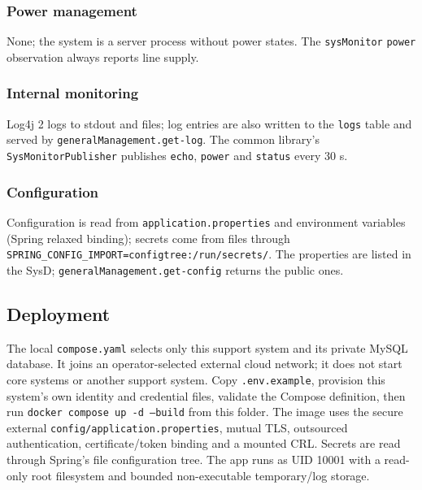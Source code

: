 \documentclass[a4paper]{arrowhead}
\begin{document}
\subsubsection{Power management}

None; the system is a server process without power states. The \texttt{sysMonitor} \texttt{power} observation always reports line supply.

\subsubsection{Internal monitoring}

Log4j 2 logs to stdout and files; log entries are also written to the \texttt{logs} table and served by \texttt{general\allowbreak{}Management.\allowbreak{}get-\allowbreak{}log}. The common library's \texttt{Sys\allowbreak{}Monitor\allowbreak{}Publisher} publishes \texttt{echo}, \texttt{power} and \texttt{status} every 30 s.

\subsubsection{Configuration}

Configuration is read from \texttt{application.\allowbreak{}properties} and environment variables (Spring relaxed binding); secrets come from files through \texttt{SPRING\_\allowbreak{}CONFIG\_\allowbreak{}IMPORT=\allowbreak{}configtree:\allowbreak{}/\allowbreak{}run/\allowbreak{}secrets/\allowbreak{}}. The properties are listed in the SysD; \texttt{general\allowbreak{}Management.\allowbreak{}get-\allowbreak{}config} returns the public ones.

\subsection{Deployment}

The local \texttt{compose.yaml} selects only this support system and its private MySQL database. It joins an operator-selected external cloud network; it does not start core systems or another support system. Copy \texttt{.env.example}, provision this system's own identity and credential files, validate the Compose definition, then run \texttt{docker compose up -d --build} from this folder. The image uses the secure external \texttt{config/application.properties}, mutual TLS, outsourced authentication, certificate/token binding and a mounted CRL. Secrets are read through Spring's file configuration tree. The app runs as UID 10001 with a read-only root filesystem and bounded non-executable temporary/log storage.
\end{document}

